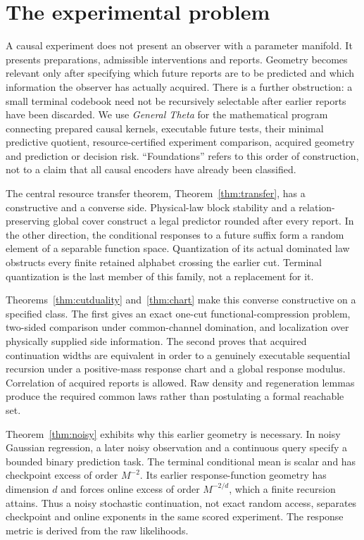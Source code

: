 \section{The experimental problem}\label{sec:problem}
A causal experiment does not present an observer with a parameter manifold. It presents preparations, admissible interventions and reports. Geometry becomes relevant only after specifying which future reports are to be predicted and which information the observer has actually acquired. There is a further obstruction: a small terminal codebook need not be recursively selectable after earlier reports have been discarded. We use \emph{General Theta} for the mathematical program connecting prepared causal kernels, executable future tests, their minimal predictive quotient, resource-certified experiment comparison, acquired geometry and prediction or decision risk. ``Foundations'' refers to this order of construction, not to a claim that all causal encoders have already been classified.

The central resource transfer theorem, Theorem~\ref{thm:transfer}, has a constructive and a converse side. Physical-law block stability and a relation-preserving global cover construct a legal predictor rounded after every report. In the other direction, the conditional responses to a future suffix form a random element of a separable function space. Quantization of its actual dominated law obstructs every finite retained alphabet crossing the earlier cut. Terminal quantization is the last member of this family, not a replacement for it.

Theorems~\ref{thm:cutduality} and~\ref{thm:chart} make this converse constructive on a specified class. The first gives an exact one-cut functional-compression problem, two-sided comparison under common-channel domination, and localization over physically supplied side information. The second proves that acquired continuation widths are equivalent in order to a genuinely executable sequential recursion under a positive-mass response chart and a global response modulus. Correlation of acquired reports is allowed. Raw density and regeneration lemmas produce the required common laws rather than postulating a formal reachable set.

Theorem~\ref{thm:noisy} exhibits why this earlier geometry is necessary. In noisy Gaussian regression, a later noisy observation and a continuous query specify a bounded binary prediction task. The terminal conditional mean is scalar and has checkpoint excess of order $M^{-2}$. Its earlier response-function geometry has dimension $d$ and forces online excess of order $M^{-2/d}$, which a finite recursion attains. Thus a noisy stochastic continuation, not exact random access, separates checkpoint and online exponents in the same scored experiment. The response metric is derived from the raw likelihoods.

